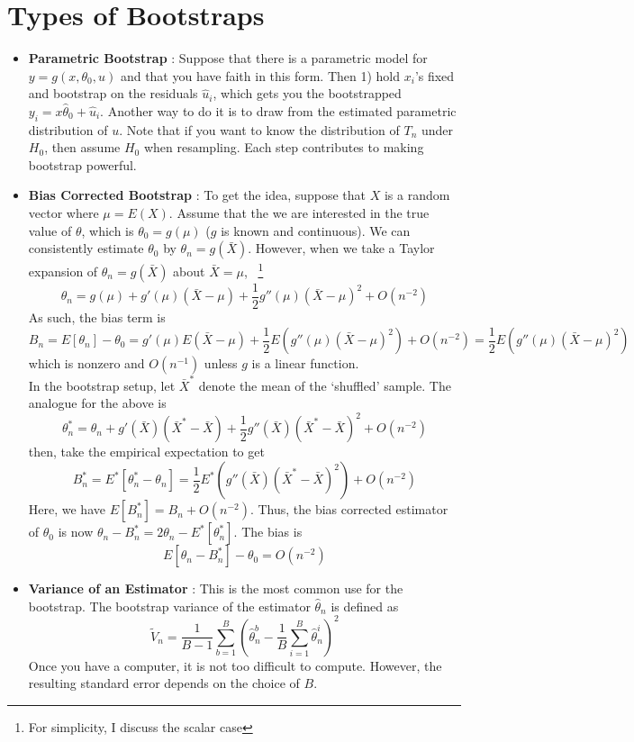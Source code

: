 \section{Types of Bootstraps}
\begin{itemize}
\item \textbf{Parametric Bootstrap} : Suppose that there is a parametric model for $y=g(x,\theta_0,u)$ and that you have faith in this form. Then 1) hold $x_i$'s fixed and bootstrap on the residuals $\hat{u}_i$, which gets you the bootstrapped $y_i = x\hat{\theta}_0+\hat{u}_i$. Another way to do it is to draw from the estimated parametric distribution of $u$. Note that if you want to know the distribution  of $T_n$ under $H_0$, then assume $H_0$ when resampling. Each step contributes to making bootstrap powerful.
\item \textbf{Bias Corrected Bootstrap} : To get the idea, suppose that $X$ is a random vector where $\mu=E(X)$. Assume that the we are interested in the true value of $\theta$, which is $\theta_0=g(\mu)$ ($g$ is known and continuous). We can consistently estimate $\theta_0$ by $\theta_n = g(\bar{X})$. However, when we take a Taylor expansion of $\theta_n=g(\bar{X})$ about $\bar{X}=\mu$, \ \footnote{For simplicity, I discuss the scalar case} 
\[
\theta_n  = g(\mu)+g'(\mu)(\bar{X}-\mu)+\frac{1}{2}g''(\mu)(\bar{X}-\mu)^2+O(n^{-2})
\]
As such, the bias term is
\[
B_n=E[\theta_n]-\theta_0 = g'(\mu)E(\bar{X}-\mu)+\frac{1}{2}E(g''(\mu)(\bar{X}-\mu)^2)+O(n^{-2})=\frac{1}{2}E(g''(\mu)(\bar{X}-\mu)^2)
\]
which is nonzero and $O(n^{-1})$ unless $g$ is a linear function. \\
In the bootstrap setup, let $\bar{X}^*$ denote the mean of the `shuffled' sample. The analogue for the above is
\[
\theta_n^* =\theta_n+g'(\bar{X})(\bar{X}^*-\bar{X})+\frac{1}{2}g''(\bar{X})(\bar{X}^*-\bar{X})^2+O(n^{-2})
\]
then, take the empirical  expectation to get
\[
B_n^*=E^*[\theta_n^*-\theta_n]=\frac{1}{2}E^*(g''(\bar{X})(\bar{X}^*-\bar{X})^2)+O(n^{-2})
\]
Here, we have $E[B_n^*]=B_n+O(n^{-2})$. Thus, the bias corrected estimator of $\theta_0$ is now $\theta_n-B_n^*=2\theta_n-E^*[\theta_n^*]$. The bias is
\[
E[\theta_n-B_n^*]-\theta_0=O(n^{-2})
\]
\item \textbf{Variance of an Estimator} : This is the most common use for the bootstrap. The bootstrap variance of the estimator $\hat{\theta}_n$ is defined as
\[
\tilde{V}_n = \frac{1}{B-1}\sum_{b=1}^B\left(\hat{\theta}_n^b-\frac{1}{B}\sum_{i=1}^B\hat{\theta}_n^i\right)^2
\]
Once you have a computer, it is not too difficult to compute. However, the resulting standard error depends on the choice of $B$.

\end{itemize}
